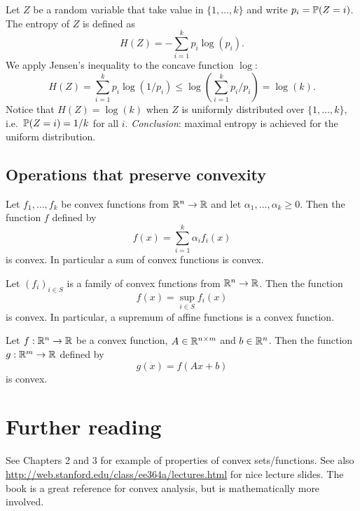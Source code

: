 \documentclass[11pt,nocut]{article}
\begin{document}
\begin{example}
	Let $Z$ be a random variable that take value in $\{1, \dots, k\}$ and write $p_i = \P(Z = i)$. The entropy of $Z$ is defined as
	$$
	H(Z) = - \sum_{i=1}^k p_i \log(p_i).
	$$
	We apply Jensen's inequality to the concave function $\log$:
	$$
	H(Z) = \sum_{i=1}^k p_i \log(1/p_i) \leq \log\left(\sum_{i=1}^k p_i / p_i\right) = \log(k).
	$$
	Notice that $H(Z) = \log(k)$ when $Z$ is uniformly distributed over $\{1,\dots,k\}$, i.e.\ $\P(Z=i) = 1/k$ for all $i$. \emph{Conclusion}: maximal entropy is achieved for the uniform distribution.
\end{example}


\subsection{Operations that preserve convexity}

\begin{proposition}
	Let $f_1, \dots, f_k$ be convex functions from $\R^n \to \R$ and let $\alpha_1, \dots, \alpha_k \geq 0$. Then the function $f$ defined by
	$$
	f(x) = \sum_{i=1}^k \alpha_i f_i(x)
	$$
	is convex. In particular a sum of convex functions is convex.
\end{proposition}

\begin{proposition}
	Let $(f_i)_{i \in S}$ is a family of convex functions from $\R^n \to \R$. Then the function
	$$
	f(x) = \sup_{i \in S} f_i(x)
	$$
	is convex. In particular, a supremum of affine functions is a convex function.
\end{proposition}

\begin{proposition}
	Let $f: \R^n \to \R$ be a convex function, $A \in \R^{n \times m}$ and $b\in\R^n$.
	Then the function $g: \R^m \to \R$ defined by
	$$
	g(x) = f(Ax + b)
	$$
	is convex.
\end{proposition}


\section*{Further reading}

See \cite{boyd2004convex} Chapters 2 and 3 for example of properties of convex sets/functions. See also \url{http://web.stanford.edu/class/ee364a/lectures.html} for nice lecture slides.
The book \cite{rockafellar1970convex} is a great reference for convex analysis, but is mathematically more involved.


\vspace{1cm}
\centerline{}




\end{document}
